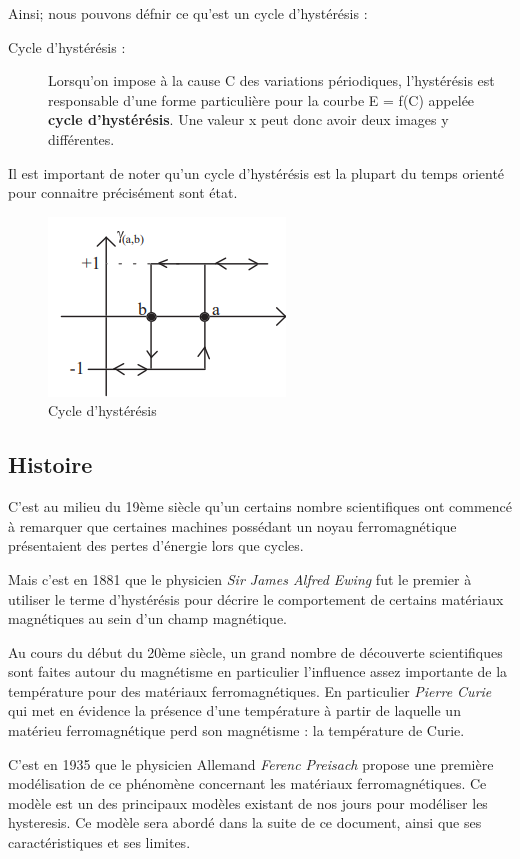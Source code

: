 \documentclass[11pt]{article}
\begin{document}
Ainsi; nous pouvons défnir ce qu'est un cycle d'hystérésis :
\begin{description}
    \item[Cycle d'hystérésis :] Lorsqu'on impose à la cause C des variations périodiques, l'hystérésis est responsable d'une forme particulière pour la 
    courbe E = f(C) appelée \textbf{cycle d'hystérésis}. Une valeur x peut donc avoir deux images y différentes.
\end{description}
Il est important de noter qu'un cycle d'hystérésis est la plupart du temps orienté pour connaitre précisément sont état.
\begin{figure}[H]
    \centering
    \includegraphics{Cycle_base.png}
    \caption{Cycle d'hystérésis}
    \label{fig:hysteresis_cycle_base}
\end{figure}

\subsection{Histoire}

C'est au milieu du 19ème siècle qu'un certains nombre scientifiques ont commencé à remarquer que
certaines machines possédant un noyau ferromagnétique présentaient des pertes d'énergie lors que cycles.



Mais c'est en 1881 que le physicien \textit{Sir James Alfred Ewing} fut le premier à utiliser le terme
d'hystérésis pour décrire le comportement de certains matériaux magnétiques au sein d'un champ magnétique.

Au cours du début du 20ème siècle, un grand nombre de découverte scientifiques sont faites autour du magnétisme
en particulier l'influence assez importante de la température pour des matériaux ferromagnétiques. 
En particulier \textit{Pierre Curie} qui met en évidence la présence d'une température à partir de laquelle
un matérieu ferromagnétique perd son magnétisme : la température de Curie.

C'est en 1935 que le physicien Allemand \textit{Ferenc Preisach} propose une première modélisation de ce phénomène concernant
les matériaux ferromagnétiques. Ce modèle est un des principaux modèles existant de nos jours pour modéliser les hysteresis.
Ce modèle sera abordé dans la suite de ce document, ainsi que ses caractéristiques et ses limites.
\end{document}
